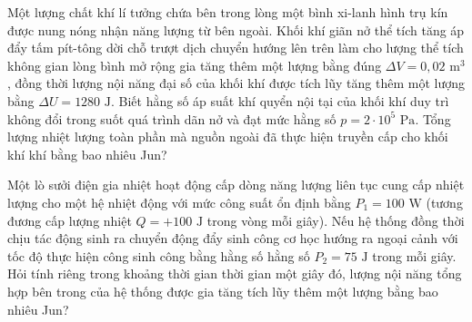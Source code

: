 \begin{ex}%
	Một lượng chất khí lí tưởng chứa bên trong lòng một bình xi-lanh hình trụ kín được nung nóng nhận năng lượng từ bên ngoài. Khối khí giãn nở thể tích tăng áp đẩy tấm pít-tông dời chỗ trượt dịch chuyển hướng lên trên làm cho lượng thể tích không gian lòng bình mở rộng gia tăng thêm một lượng bằng đúng $\Delta V = 0,02\text{ m}^3$, đồng thời lượng nội năng đại số của khối khí được tích lũy tăng thêm một lượng bằng $\Delta U = 1280\text{ J}$. Biết hằng số áp suất khí quyển nội tại của khối khí duy trì không đổi trong suốt quá trình dãn nở và đạt mức hằng số $p = 2 \cdot 10^{5}\text{ Pa}$. Tổng lượng nhiệt lượng toàn phần mà nguồn ngoài đã thực hiện truyền cấp cho khối khí khí bằng bao nhiêu Jun?
\end{ex}

\begin{ex}%
	Một lò sưởi điện gia nhiệt hoạt động cấp dòng năng lượng liên tục cung cấp nhiệt lượng cho một hệ nhiệt động với mức công suất ổn định bằng $P_1 = 100\text{ W}$ (tương đương cấp lượng nhiệt $Q = +100\text{ J}$ trong vòng mỗi giây). Nếu hệ thống đồng thời chịu tác động sinh ra chuyển động đẩy sinh công cơ học hướng ra ngoại cảnh với tốc độ thực hiện công sinh công bằng hằng số hằng số $P_2 = 75\text{ J}$ trong mỗi giây. Hỏi tính riêng trong khoảng thời gian thời gian một giây đó, lượng nội năng tổng hợp bên trong của hệ thống được gia tăng tích lũy thêm một lượng bằng bao nhiêu Jun?
\end{ex}

